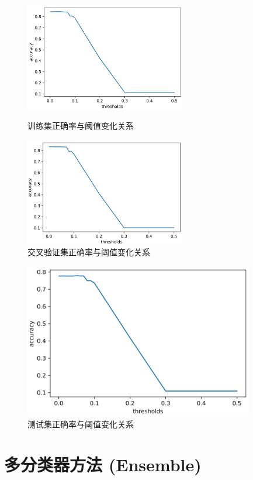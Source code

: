 \documentclass[openany]{ctexbook}
\theoremstyle{kaiti}
\theoremstyle{normal}
\begin{document}
\begin{figure}[htbp]
  \centering
  \begin{minipage}[t]{0.48\textwidth}
    \centering
    \includegraphics[width=7cm]{train.png}
    \caption{训练集正确率与阈值变化关系}
    \label{fig:train}
  \end{minipage}
  \begin{minipage}[t]{0.48\textwidth}
    \centering
    \includegraphics[width=7cm]{cross_validation.png}
    \caption{交叉验证集正确率与阈值变化关系}
    \label{fig:cross_validation}
  \end{minipage}
\end{figure}

\begin{figure}
  \centering
  \includegraphics[width=10cm]{test.png}
  \caption{测试集正确率与阈值变化关系}
  \label{fig:test}
\end{figure}

\chapter{多分类器方法 (Ensemble) }
\end{document}
